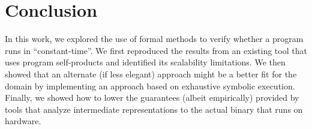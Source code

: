 \section{Conclusion}

In this work, we explored the use of formal methods to verify whether a program runs in ``constant-time''. 
We first reproduced the results from an existing tool that uses program self-products and identified its scalability limitations.
We then showed that an alternate (if less elegant) approach might be a better fit for the domain by implementing an approach based on exhaustive symbolic execution. 
Finally, we showed how to lower the guarantees (albeit empirically) provided by tools that analyze intermediate representations to the actual binary that runs on hardware.
